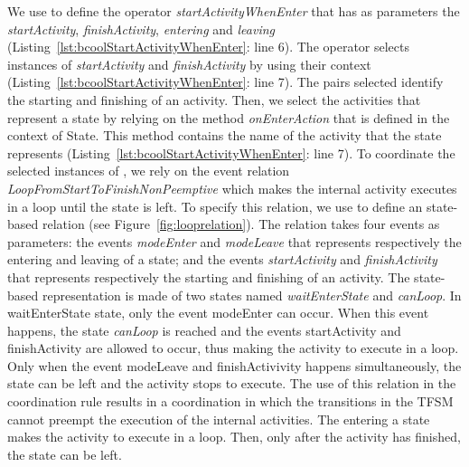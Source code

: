 We use \bcool to define the operator \emph{startActivityWhenEnter} that has as parameters the \dse \textit{startActivity}, \textit{finishActivity}, \textit{entering} and \textit{leaving} (Listing~\ref{lst:bcoolStartActivityWhenEnter}: line 6). The operator selects instances of \dse \emph{startActivity} and \emph{finishActivity} by using their context (Listing~\ref{lst:bcoolStartActivityWhenEnter}: line 7). The pairs selected identify the starting and finishing of an activity. Then, we select the activities that represent a state by relying on the method \emph{onEnterAction} that is defined in the context of State. This method contains the name of the activity that the state represents (Listing~\ref{lst:bcoolStartActivityWhenEnter}: line 7). To coordinate the selected instances of \dse, we rely on the event relation \emph{LoopFromStartToFinishNonPeemptive} which makes the internal activity executes in a loop until the state is left. To specify this relation, we use \moccml to define an state-based relation (see Figure~\ref{fig:looprelation}). The relation takes four events as parameters: the events \emph{modeEnter} and \emph{modeLeave} that represents respectively the entering and leaving of a state; and the events \emph{startActivity} and \emph{finishActivity} that represents respectively the starting and finishing of an activity. The state-based representation is made of two states named \emph{waitEnterState} and \emph{canLoop}. In waitEnterState state, only the event modeEnter can occur. When this event happens, the state \emph{canLoop} is reached and the events startActivity and finishActivity are allowed to occur, thus making the activity to execute in a loop. Only when the event modeLeave and finishActivivity happens simultaneously, the state can be left and the activity stops to execute. The use of this relation in the coordination rule results in a coordination in which the transitions in the TFSM cannot preempt the execution of the internal activities. The entering a state makes the activity to execute in a loop. Then, only after the activity has finished, the state can be left.



